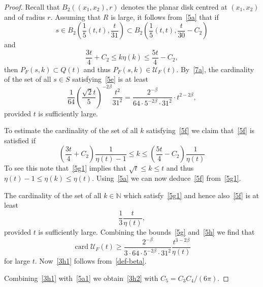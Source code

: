 \documentclass[10pt,a4paper]{amsart}
\def\N{\mathbb N}
\def\cU{\mathcal U}
\def\card{\operatorname{card}}
\begin{document}
\begin{proof}
Recall that  $B_2((x_1,x_2),r)$ denotes
the planar disk centred at $(x_1,x_2)$ and of radius $r$. Assuming that $R$ is large, it follows from~\eqref{5a} that 
if 
\begin{equation}\label{5e}
s
\in
 B_2\!\left( \frac15(t, t),\frac{t}{31}\right)
\subset
 B_2\!\left( \frac15(t, t),\frac{t}{30}-C_2\right)
\end{equation}
and 
\begin{equation}\label{5f}
\frac{3t}{4}+C_2\leq k\eta(k) \leq \frac{5t}{4}-C_2 ,
\end{equation}
then $P_F(s,k)\subset Q(t)$ and thus $P_F(s,k)\in \cU_F(t)$.
By~\eqref{7a}, 
the cardinality of the set of all $s\in S$ satisfying~\eqref{5e} 
is at least 
\begin{equation}\label{5g}
\frac{1}{64} \left(\frac{\sqrt{2}t}{5}\right)^{-2\beta} \frac{t^2}{31^2}
=\frac{2^{-\beta} }{64\cdot 5^{-2\beta} \cdot 31^2} \cdot t^{2-2\beta},
\end{equation}
provided $t$ is sufficiently large.

To estimate the cardinality of the set of all $k$ satisfying~\eqref{5f} we 
claim that~\eqref{5f} is satisfied if 
\begin{equation}\label{5g1}
\left(\frac{3t}{4}+C_2\right)\frac{1}{\eta(t)-1}
\leq k\leq
\left(\frac{5t}{4}-C_2\right)\frac{1}{\eta(t)}
\end{equation}
To see this note that~\eqref{5g1} implies that 
$\sqrt{t}\leq k\leq t$ and thus $\eta(t)-1\leq\eta(k)\leq \eta(t)$.
Using~\eqref{5a} we can now deduce~\eqref{5f} from~\eqref{5g1}.

The cardinality of the 
set of all $k\in\N$ which satisfy~\eqref{5g1} and hence also~\eqref{5f} is at least
\begin{equation}\label{5h}
\frac13 \frac{t}{\eta(t)},
\end{equation}
provided $t$ is sufficiently large.
Combining the bounds~\eqref{5g} and~\eqref{5h} we find that 
\begin{equation}\label{5i}
\card \cU_F(t)
\geq \frac{2^{-\beta} }{3\cdot 64\cdot 5^{-2\beta} \cdot 31^2} \frac{t^{3-2\beta}}{\eta(t)}
\end{equation}
for large $t$. 
Now~\eqref{3h1} follows from~\eqref{def-beta}.

Combining~\eqref{3h1} with~\eqref{5a1} we obtain~\eqref{3h2} with $C_5=C_3C_4/(6\pi)$.


\end{proof}
\end{document}
